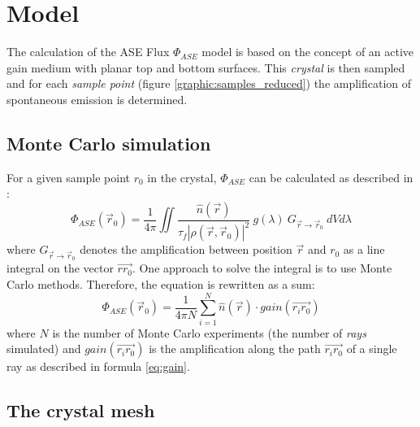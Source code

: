 \section{Model}



The calculation of the ASE Flux $\Phi_{ASE}$ model is based on the concept of an
active gain medium with planar top and bottom surfaces. This \emph{crystal} is
then sampled and for each \emph{sample point} (figure
\ref{graphic:samples_reduced}) the amplification of spontaneous emission is
determined. 


\subsection{Monte Carlo simulation}
\label{subsec:monteCarlo}

For a given sample point $r_0$ in the crystal, $\Phi_{ASE}$ can
be calculated as described in \cite{ASE2010}:
\begin{equation}
  \label{eq:phi_ase_daniel} 
  \Phi_{ASE}(\vec{r}_0)=\frac{1}{4\pi}\iint
  \frac
    {\hat{n}(\vec{r})}
    {\tau_{f}|\rho(\vec{r},\vec{r}_0)|^2}
  ~g(\lambda)
  ~G_{\vec{r}\rightarrow\vec{r}_0}
  ~dV d\lambda
\end{equation}
where $G_{\vec{r}\rightarrow\vec{r}_0}$ denotes the amplification between
position $\vec{r}$ and $r_0$ as a line integral on the vector
$\overrightarrow{rr_0}$.  One approach to solve the integral is to use Monte
Carlo methods. Therefore, the equation is rewritten as a sum:
\begin{equation}
  \label{eq:monte_carlo_ase}
  \Phi_{ASE}(\vec{r}_0) = 
  \frac{1}{4\pi N}
  \sum^{N}_{i=1} \hat{n}(\vec{r}) \cdot gain(\overrightarrow{r_ir_0})
\end{equation}
where $N$ is the number of Monte Carlo experiments (the number of \emph{rays}
simulated) and $gain(\overrightarrow{r_ir_0})$ is the amplification along the
path $\overrightarrow{r_ir_0}$ of a single ray as described in formula \ref{eq:gain}.




\subsection{The crystal mesh} \label{subsec:meshSampling}

